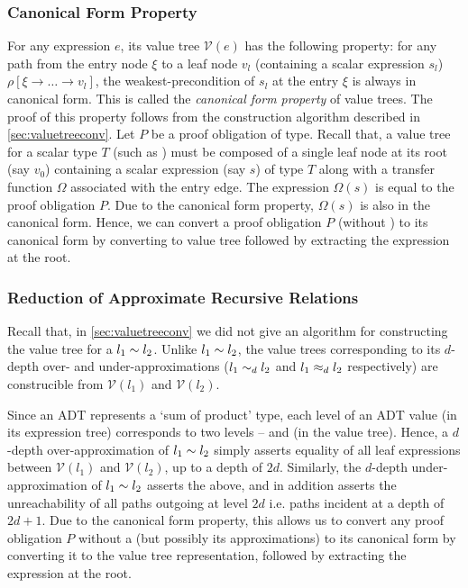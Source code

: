 \subsubsection{Canonical Form Property}
For any expression $e$, its value tree $\mathcal{V}(e)$ has the following property:
for any path from the entry node $\xi$ to a leaf node $v_l$ (containing a scalar expression $s_l$)
$\rho[\xi \rightarrow \dots \rightarrow v_l]$, the weakest-precondition of $s_l$ at the entry $\xi$
is always in canonical form.
This is called the {\em canonical form property} of value trees.
The proof of this property follows from the construction algorithm described in \cref{sec:valuetreeconv}.
Let $P$ be a proof obligation of  type.
Recall that, a value tree for a scalar type $T$ (such as ) must be composed of a single leaf node at its root
(say $v_0$) containing a scalar expression (say $s$) of type $T$ along with a transfer function $\Omega$ associated
with the entry edge.
The expression $\Omega(s)$ is equal to the proof obligation $P$.
Due to the canonical form property, $\Omega(s)$ is also in the canonical form.
Hence, we can convert a proof obligation $P$ (without \recursiveRelations{}) to its canonical form
by converting to value tree followed by extracting the expression at the root.

\subsubsection{Reduction of Approximate Recursive Relations}
Recall that, in \cref{sec:valuetreeconv} we did not give an algorithm for constructing the value
tree for a \recursiveRelation{} $l_1 \sim{} l_2$.
Unlike $l_1 \sim{} l_2$, the value trees corresponding to its $d$-depth
over- and under-approximations ($l_1 \sim_{d} l_2$ and $l_1 \approx_{d} l_2$ respectively)
are construcible from $\mathcal{V}(l_1)$ and $\mathcal{V}(l_2)$.

Since an ADT represents a `sum of product' type, each level of an ADT value (in its expression tree)
corresponds to two levels -- \sumn{} and \prodn{} (in the value tree).
Hence, a $d$-depth over-approximation of $l_1 \sim{} l_2$ simply asserts equality of all
leaf expressions between $\mathcal{V}(l_1)$ and $\mathcal{V}(l_2)$, up to a depth of $2d$.
Similarly, the $d$-depth under-approximation of $l_1 \sim{} l_2$ asserts the above,
and in addition asserts the unreachability of all paths outgoing at level $2d$ i.e. paths
incident at a depth of $2d+1$.
Due to the canonical form property, this allows us to convert any proof obligation $P$ without
a \recursiveRelation{} (but possibly its approximations) to its canonical form
by converting it to the value tree representation, followed by extracting the expression at the root.

